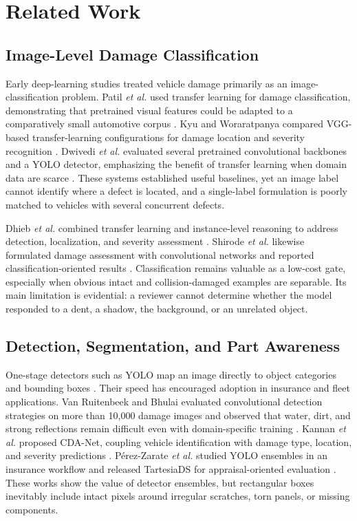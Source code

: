 \documentclass[conference]{IEEEtran}
\begin{document}
\section{Related Work}

\subsection{Image-Level Damage Classification}

Early deep-learning studies treated vehicle damage primarily as an image-classification problem. Patil \emph{et al.} used transfer learning for damage classification, demonstrating that pretrained visual features could be adapted to a comparatively small automotive corpus \cite{patil2017}. Kyu and Woraratpanya compared VGG-based transfer-learning configurations for damage location and severity recognition \cite{kyu2020}. Dwivedi \emph{et al.} evaluated several pretrained convolutional backbones and a YOLO detector, emphasizing the benefit of transfer learning when domain data are scarce \cite{dwivedi2021}. These systems established useful baselines, yet an image label cannot identify where a defect is located, and a single-label formulation is poorly matched to vehicles with several concurrent defects.

Dhieb \emph{et al.} combined transfer learning and instance-level reasoning to address detection, localization, and severity assessment \cite{dhieb2019}. Shirode \emph{et al.} likewise formulated damage assessment with convolutional networks and reported classification-oriented results \cite{shirode2022}. Classification remains valuable as a low-cost gate, especially when obvious intact and collision-damaged examples are separable. Its main limitation is evidential: a reviewer cannot determine whether the model responded to a dent, a shadow, the background, or an unrelated object.

\subsection{Detection, Segmentation, and Part Awareness}

One-stage detectors such as YOLO map an image directly to object categories and bounding boxes \cite{redmon2016}. Their speed has encouraged adoption in insurance and fleet applications. Van Ruitenbeek and Bhulai evaluated convolutional detection strategies on more than 10,000 damage images and observed that water, dirt, and strong reflections remain difficult even with domain-specific training \cite{vanruitenbeek2022}. Kannan \emph{et al.} proposed CDA-Net, coupling vehicle identification with damage type, location, and severity predictions \cite{kannan2024}. P\'erez-Zarate \emph{et al.} studied YOLO ensembles in an insurance workflow and released TartesiaDS for appraisal-oriented evaluation \cite{perez2024}. These works show the value of detector ensembles, but rectangular boxes inevitably include intact pixels around irregular scratches, torn panels, or missing components.
\end{document}
